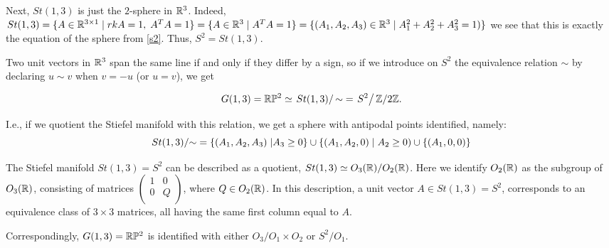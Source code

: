 \documentclass[11pt,a4paper]{report}
\begin{document}
      Next, $St(1,3)$ is just the $2$-sphere in $\mathbb{R}^3$.
%
%
%
      Indeed, $St(1,3) = \{ A \in \mathbb{R}^{3 \times 1} \; | \; rkA=1, \; A^T A = 1 \} = \{ A \in \mathbb{R}^3 \; | \; A^T A = 1 \} = 
\{ (A_1, A_2, A_3) \in \mathbb{R}^3 \; | \; A_1^2 + A_2^2 + A_3^2 = 1) \} $ 
we see that this is exactly the equation of the sphere from \ref{s2}. Thus, $S^2=St(1,3)$.


      Two unit vectors in $\mathbb{R}^3$ span the same line if and only if they differ by a sign, so if we introduce on $S^2$
      the equivalence relation $\sim$ by declaring $u\sim v$ when $v=-u$ (or $u=v$), we get
      
      \[
      	 G(1,3)= \mathbb{R}\mathbb{P}^2 \simeq \left. St(1,3)\right/{\sim}= \left. S^2\right/{\mathbb{Z}/2\mathbb{Z}}.
      \]

      
I.e., if we quotient the Stiefel manifold with this relation, we get a sphere with antipodal points identified, namely: 
$$ St(1,3)/{\sim} = \{ (A_1, A_2, A_3) \; | A_3 \geq 0 \} \cup \{ (A_1, A_2, 0) \; | \; A_2 \geq 0) \cup \{ (A_1, 0, 0) \}  $$

	
	The Stiefel manifold $St(1,3)=S^2$ can be described as a quotient, $St(1,3)\simeq O_3(\mathbb{R})/O_2(\mathbb{R})$. Here
	we identify $O_2(\mathbb{R})$ as the subgroup of $O_3(\mathbb{R})$, consisting of matrices $\begin{pmatrix}
	                                                                               	1&0\\
	                                                                               	0&Q\\
	                                                                               \end{pmatrix}$,
	where $Q\in O_2(\mathbb{R})$. In this description, a unit vector $A\in St(1,3)=S^2$, 
	corresponds to an equivalence class of $3\times 3$ matrices, all having the same first column equal to $A$.
	
	Correspondingly, $G(1,3)=\mathbb{R}\mathbb{P}^2$ is identified with either $O_3/O_1\times O_2$ or $S^2/O_1$.
\end{document}

